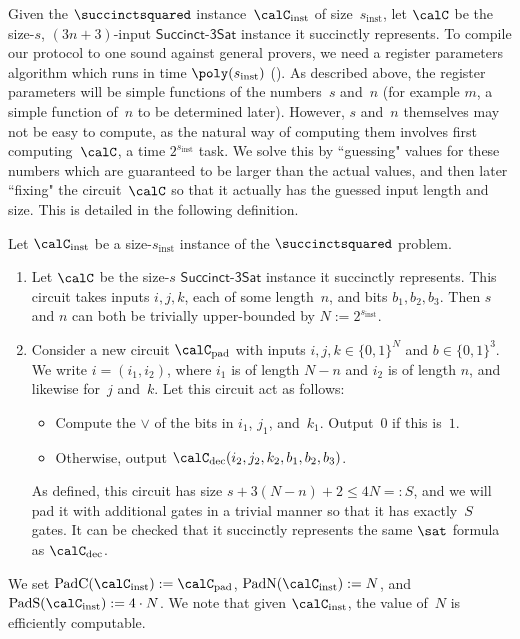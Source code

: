 Given the $\succinctsquared$ instance~$\calC_{\mathrm{inst}}$
of size~$s_{\mathrm{inst}}$,
let $\calC$ be the size-$s$, $(3n+3)$-input $\mathsf{Succinct}$-$\mathsf{3Sat}$ instance it succinctly represents.
To compile our protocol to one sound against general provers,
we need a register parameters algorithm which runs in time $\poly(s_{\mathrm{inst}})$ ().
As described above, the register parameters will be simple functions of the numbers~$s$ and~$n$
(for example $m$, a simple function of~$n$ to be determined later).
However, $s$ and~$n$ themselves may not be easy to compute,
as the natural way of computing them involves first computing~$\calC$,
a time $2^{s_{\mathrm{inst}}}$ task.
We solve this by ``guessing" values for these numbers which are guaranteed to be larger than the actual values,
and then later ``fixing" the circuit~$\calC$ so that it actually has the guessed input length and size.
This is detailed in the following definition.

\begin{definition}\label{def:register-parameters}
Let $\calC_{\mathrm{inst}}$ be a size-$s_{\mathrm{inst}}$ instance of the $\succinctsquared$ problem.
\begin{enumerate}
\item Let $\calC$ be the size-$s$ $\mathsf{Succinct}$-$\mathsf{3Sat}$ instance it succinctly represents.
This circuit takes inputs $i, j, k$, each of some length~$n$, and bits $b_1, b_2, b_3$.
Then $s$ and $n$ can both be trivially upper-bounded by $N := 2^{s_{\mathrm{inst}}}$.
\item Consider a new circuit $\calC_{\mathrm{pad}}$ with inputs $i, j, k \in \{0, 1\}^{N}$ and $b \in \{0, 1\}^3$. We write $i = (i_1, i_2)$, where $i_1$ is of length $N - n$ and $i_2$ is of length $n$, and likewise for~$j$ and~$k$. Let this circuit act as follows:
\begin{itemize}
\item[$\circ$] Compute the $\lor$ of the bits in $i_1$, $j_1$, and~$k_1$. Output~$0$ if this is~$1$.
\item[$\circ$] Otherwise, output $\calC_{\mathrm{dec}}(i_2, j_2, k_2, b_1, b_2, b_3)$.
\end{itemize}
As defined, this circuit has size $s + 3 (N - n) + 2 \leq 4 N =: S$,
and we will pad it with additional gates in a trivial manner so that it has exactly~$S$ gates.
It can be checked that it succinctly represents the same $\sat$ formula as $\calC_{\mathrm{dec}}$.
\end{enumerate}
We set $\mathrm{PadC}(\calC_{\mathrm{inst}}) := \calC_{\mathrm{pad}}$, $\mathrm{PadN}(\calC_{\mathrm{inst}}) := N$,
and $\mathrm{PadS}(\calC_{\mathrm{inst}}):= 4 \cdot N$.
We note that given $\calC_{\mathrm{inst}}$, the value of~$N$ is efficiently computable.
\end{definition}

